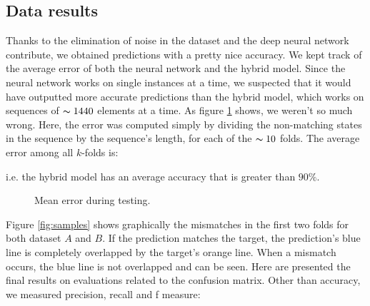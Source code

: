 \documentclass[10pt,a4paper]{article}
\begin{document}
\subsection{Data results}
	Thanks to the elimination of noise in the dataset and the deep neural network contribute, we obtained predictions with a pretty nice accuracy. We kept track of the average error of  both the neural network and the hybrid model. Since the neural network works on single instances at a time, we suspected that it would have outputted more accurate predictions than the hybrid model, which works on sequences of $\thicksim 1440$ elements at a time. As figure \ref{figure:err_graph} shows, we weren't so much wrong. Here, the error was computed simply by dividing the non-matching states in the sequence by the sequence's length, for each of the $\thicksim 10$ folds. The average error among all $k$-folds is:\\
	\begin{center}
	\end{center}
i.e. the hybrid model has an average accuracy that is greater than $90\%.$
	\begin{figure}
		\centering
		\caption{Mean error during testing.}
		\label{figure:err_graph}
	\end{figure}
	
	Figure \ref{fig:samples} shows graphically the mismatches in the first two folds for both dataset $A$ and $B$. If the prediction matches the target, the prediction's blue line is completely overlapped by the target's orange line. When a mismatch occurs, the blue line is not overlapped and can be seen. Here are presented the final results on evaluations related to the confusion matrix. Other than accuracy, we measured precision, recall and f measure:
	\begin{center}
	\end{center}
\end{document}
